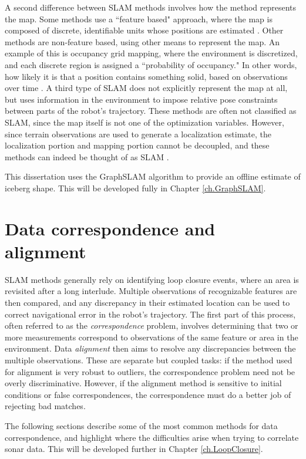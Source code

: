 A second difference between SLAM methods involves how the method represents the map. Some methods use a ``feature based" approach, where the map is composed of discrete, identifiable units whose positions are estimated \cite{Durrant2006}. Other methods are non-feature based, using other means to represent the map. An example of this is occupancy grid mapping, where the environment is discretized, and each discrete region is assigned a ``probability of occupancy." In other words, how likely it is that a position contains something solid, based on observations over time \cite{Fairfield2007}.  A third type of SLAM does not explicitly represent the map at all, but uses information in the environment to impose relative pose constraints between parts of the robot's trajectory. These methods are often not classified as SLAM, since the map itself is not one of the optimization variables. However, since terrain observations are used to generate a localization estimate,  the localization portion and mapping portion cannot be decoupled, and these methods can indeed be thought of as SLAM \cite{Caress2008}. 

This dissertation uses the GraphSLAM algorithm \cite{Thrun2006} to provide an offline estimate of iceberg shape. This will be developed fully in Chapter \ref{ch.GraphSLAM}. 


\section{Data correspondence and alignment}

SLAM methods generally rely on identifying loop closure events, where an area is revisited after a long interlude. Multiple observations of recognizable features are then compared, and any discrepancy in their estimated location can be used to correct navigational error in the robot's trajectory. The first part of this process, often referred to as the \emph{correspondence} problem, involves determining that two or more measurements correspond to observations of the same feature or area in the environment. Data \emph{alignment} then aims to resolve any discrepancies between the multiple observations. These are separate but coupled tasks: if the method used for alignment is very robust to outliers, the correspondence problem need not be overly discriminative. However, if the alignment method is sensitive to initial conditions or false correspondences, the correspondence must do a better job of rejecting bad matches. 

The following sections describe some of the most common methods for data correspondence, and highlight where the difficulties arise when trying to correlate sonar data. This will be developed further in Chapter \ref{ch.LoopClosure}.


